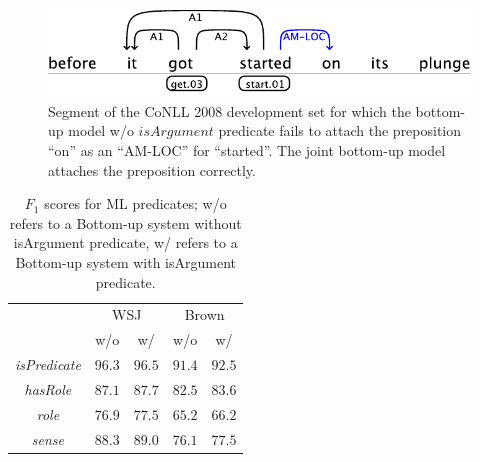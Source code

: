 \begin{figure}
\begin{center}
    \includegraphics[scale=.62]{is-arg-example}
\end{center}
\caption{Segment of the CoNLL 2008 development set for which the bottom-up model w/o $isArgument$ predicate fails to attach the preposition ``on'' as an ``AM-LOC'' for ``started''. The joint bottom-up model attaches the preposition correctly.}
\label{fig:isArg}
\end{figure}


\begin{table}[ht]

    \centering
    \begin{tabular}{|c|c|c|c|c|}\hline
      & \multicolumn{2}{c|}{WSJ} & \multicolumn{2}{c|}{Brown}\\
                                  & w/o     & w/     & w/o    & w/  \\\hline 
        \emph{isPredicate}        & $96.3$  & $96.5$ & $91.4$ & $92.5$\\
        \emph{hasRole}            & $87.1$  & $87.7$ & $82.5$ & $83.6$ \\
        \emph{role}               & $76.9$  & $77.5$ & $65.2$ & $66.2$ \\
        \emph{sense}              & $88.3$  & $89.0$ & $76.1$ & $77.5$ \\\hline
    \end{tabular}
    \caption{$F_1$ scores for ML predicates; w/o refers to a Bottom-up system without isArgument predicate, w/ refers to a Bottom-up system with isArgument predicate.}
    \label{tbl:isArg}
\end{table}




